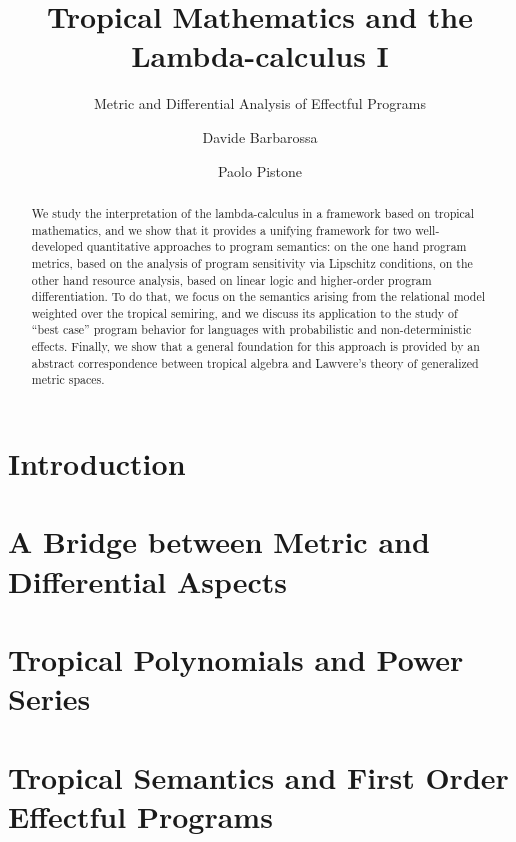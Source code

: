 \documentclass[a4paper,english, UKenglish,cleveref, autoref, thm-restate]{lipics-v2021}
\title{Tropical Mathematics and the Lambda-calculus I}
\subtitle{Metric and Differential Analysis of Effectful Programs
} %
\author{Davide {Barbarossa}}{Universit\`a di Bologna, %
Italy%
\and \url{https://lipn.univ-paris13.fr/\~barbarossa/index.html} }{davide.barbarossa@unibo.it}{https://orcid.org/0000-0003-4608-8282}{%
}%
\author{Paolo {Pistone}}{Universit\`a di Bologna, %
Italy%
\and \url{http://logica.uniroma3.it/pistone/
} }{paolo.pistone2@unibo.it}{https://orcid.org/0000-0003-4250-9051}{%
}
\begin{document}
\maketitle

\begin{abstract}
We study the interpretation of the lambda-calculus in a framework based on tropical mathematics, and we show that it provides a unifying framework for two well-developed quantitative approaches to program semantics: on the one hand program metrics, based on the analysis of program sensitivity via Lipschitz conditions, on the other hand resource analysis, based on linear logic and higher-order program differentiation. 
To do that, we focus on the semantics arising from the relational model weighted over the tropical semiring, and we discuss its application to the study of “best case” program behavior for languages with probabilistic and non-deterministic effects. Finally, we show that a general foundation for this approach is provided by an abstract correspondence between tropical algebra and Lawvere’s theory of generalized metric spaces.
\end{abstract}

\section{Introduction}



\section{A Bridge between Metric and Differential Aspects}\label{section5bis}



\section{Tropical Polynomials and Power Series}\label{section2}


\section{Tropical Semantics and First Order Effectful Programs}\label{section22}

\end{document}
